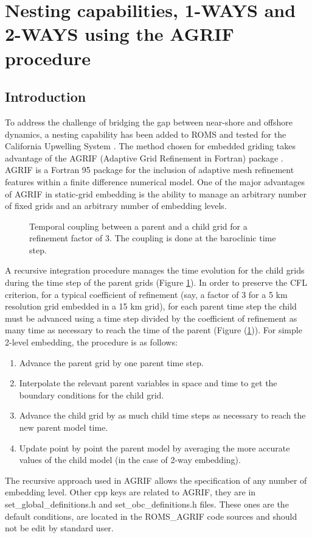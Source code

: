 \section{Nesting capabilities, 1-WAYS and 2-WAYS using the AGRIF procedure}

\subsection{Introduction}
To address the challenge of bridging the gap between near-shore and offshore
dynamics, a nesting capability has been added to ROMS and tested for the California
Upwelling System \citep{Pen04}.  The method chosen for embedded griding takes
advantage of the AGRIF (Adaptive Grid Refinement in Fortran) package
\citep{Bla99,Deb00, Deb03a,Deb03b,Deb08}.  AGRIF is a Fortran 95 package for the
inclusion of adaptive mesh refinement features within a finite difference numerical
model. One of the major advantages of AGRIF in static-grid embedding is the ability
to manage an arbitrary number of fixed grids and an arbitrary number of embedding
levels.

\begin{figure}[htbp]
\centerline{}
\caption{Temporal coupling between a parent and a child grid for a refinement factor
  of 3.  The coupling is done at the baroclinic time step.}
\label{fig:temp_coupling}
\end{figure}

A recursive integration procedure manages the time evolution for the child grids
during the time step of the parent grids (Figure \ref{fig:temp_coupling}). In order
to preserve the CFL criterion, for a typical coefficient of refinement (say, a factor
of 3 for a 5 km resolution grid embedded in a 15 km grid), for each parent time step
the child must be advanced using a time step divided by the coefficient of refinement
as many time as necessary to reach the time of the parent (Figure
(\ref{fig:temp_coupling})).  For simple 2-level embedding, the
procedure is as follows:\\
\begin{enumerate}
\item Advance the parent grid by one parent time step.
\item Interpolate the relevant parent variables in space and time to get the boundary
  conditions for the child grid.
\item Advance the child grid by as much child time steps as necessary
to reach the new parent model time.
\item Update point by point the parent model by averaging the more accurate values of
  the child model (in the case of 2-way embedding).
\end{enumerate}
The recursive approach used in AGRIF allows the specification of any number of
embedding level. Other cpp keys are related to AGRIF, they are in
  set\_global\_definitions.h and set\_obc\_definitions.h files. These ones are the
  default conditions, are located in the ROMS\_AGRIF code sources and should not be
  edit by standard user.

